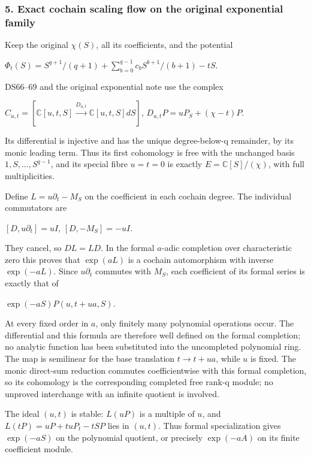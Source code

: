 \subsubsection{5. Exact cochain scaling flow on the original exponential family}\label{endpoint-f1_scaling--exact-cochain-scaling-flow-on-the-original-exponential-family}

Keep the original \(\chi(S)\), all its coefficients, and the potential

\(\Phi_t(S)=S^{q+1}/(q+1)+\sum_{b=0}^{q-1} c_b S^{b+1}/(b+1)-tS\).

DS66--69 and the original exponential note use the complex

\(C_{u,t}=[\mathbb C[u,t,S]\xrightarrow{D_{u,t}}\mathbb C[u,t,S]dS]\), \(D_{u,t}P=u P_S+(\chi-t)P\).

Its differential is injective and has the unique degree-below-q remainder, by its monic leading term. Thus its first cohomology is free with the unchanged basis \(1,S,\ldots,S^{q-1}\), and its special fibre \(u=t=0\) is exactly \(E=\mathbb C[S]/(\chi)\), with full multiplicities.

Define \(L=u \partial_t-M_S\) on the coefficient in each cochain degree. The individual commutators are

\([D,u \partial_t]=u I\), \([D,-M_S]=-u I\).

They cancel, so \(D L=L D\). In the formal \(a\)-adic completion over characteristic zero this proves that \(\exp(aL)\) is a cochain automorphism with inverse \(\exp(-aL)\). Since \(u \partial_t\) commutes with \(M_S\), each coefficient of its formal series is exactly that of

\(\exp(-aS)P(u,t+ua,S)\).

At every fixed order in \(a\), only finitely many polynomial operations occur. The differential and this formula are therefore well defined on the formal completion; no analytic function has been substituted into the uncompleted polynomial ring. The map is semilinear for the base translation \(t\to t+ua\), while \(u\) is fixed. The monic direct-sum reduction commutes coefficientwise with this formal completion, so its cohomology is the corresponding completed free rank-q module; no unproved interchange with an infinite quotient is involved.

The ideal \((u,t)\) is stable: \(L(uP)\) is a multiple of \(u\), and \(L(tP)=uP+tu P_t-tSP\) lies in \((u,t)\). Thus formal specialization gives \(\exp(-aS)\) on the polynomial quotient, or precisely \(\exp(-aA)\) on its finite coefficient module.

